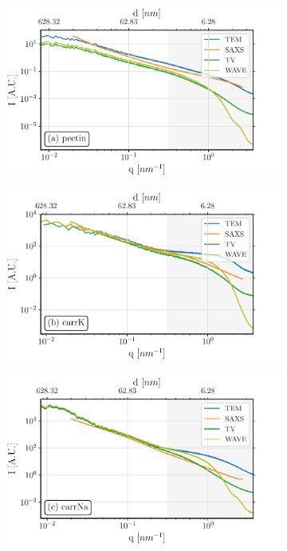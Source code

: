 \begin{figure}[!h]
  \begin{subfigure}{0.325\linewidth}
    \noindent\includegraphics[width=\textwidth]{Figures/chapter-temsaxs/saxs-tem-TV-pectin.pdf}\label{fig:denoise_pectin}
  \end{subfigure}
  \begin{subfigure}{0.325\linewidth}
    \includegraphics[width=\textwidth]{Figures/chapter-temsaxs/saxs-tem-TV-carK.pdf}\label{fig:denoise_carrK}
  \end{subfigure}
  \begin{subfigure}{0.325\linewidth}
    \includegraphics[width=\textwidth]{Figures/chapter-temsaxs/saxs-tem-TV-carNa.pdf}\label{fig:denoise_carrNa}

\end{subfigure}
\end{figure}
